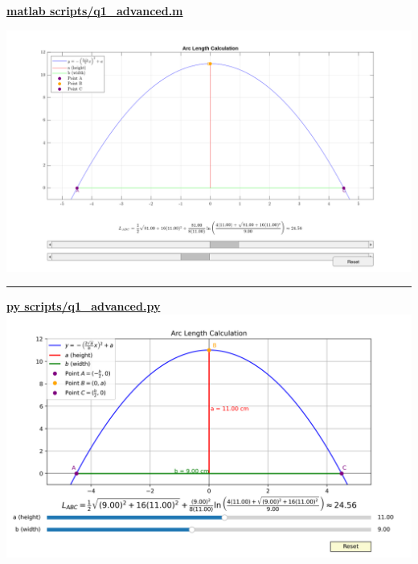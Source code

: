 \documentclass[a4paper, 12pt]{report}
\def\link{blue!50!black}
\begin{document}
    \newpage
    
    \centering
    
    \href{https://github.com/sakx7/mathcompuni/blob/main/matlab scripts/q1_advanced.m}{\textcolor{\link}{\textbf{matlab scripts/q1\_advanced.m}}}
   
    
    \includegraphics[width=1\textwidth]{images/rmatFigure_1.png}\\
    \vspace{2em}    
    \hrule
    \vspace{3em}
    \href{https://github.com/sakx7/mathcompuni/blob/main/py scripts/q1_advanced.py}{\textcolor{\link}{\textbf{py scripts/q1\_advanced.py}}}
    \includegraphics[width=1\textwidth]{images/Figure_1.png}\\
\end{document}
